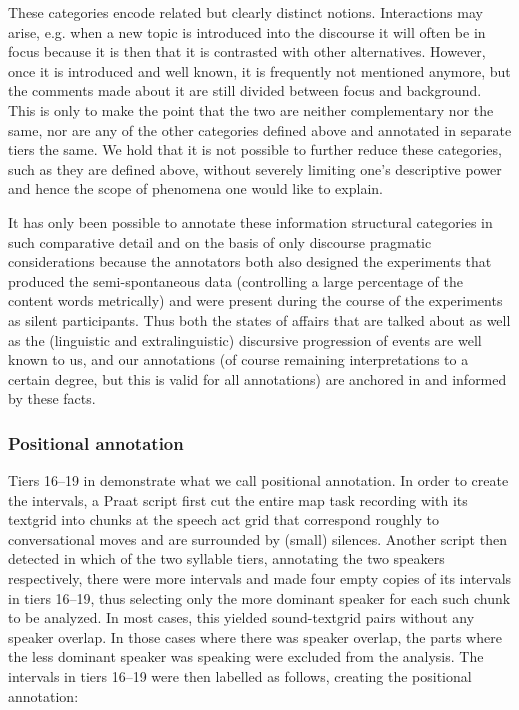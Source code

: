 \documentclass[output=paper]{LSP/langsci}
\begin{document}
These categories encode related but clearly distinct notions. Interactions may arise, e.g. when a new topic is introduced into the discourse it will often be in focus because it is then that it is contrasted with other alternatives. However, once it is introduced and well known, it is frequently not mentioned anymore, but the comments made about it are still divided between focus and background. This is only to make the point that the two are neither complementary nor the same, nor are any of the other categories defined above and annotated in separate tiers the same. We hold that it is not possible to further reduce these categories, such as they are defined above, without severely limiting one’s descriptive power and hence the scope of phenomena one would like to explain. 

It has only been possible to annotate these information structural categories in such comparative detail and on the basis of only discourse pragmatic considerations because the annotators both also designed the experiments that produced the semi-spontaneous data (controlling a large percentage of the content words metrically) and were present during the course of the experiments as silent participants. Thus both the states of affairs that are talked about as well as the (linguistic and extralinguistic) discursive progression of events are well known to us, and our annotations (of course remaining interpretations to a certain degree, but this is valid for all annotations) are anchored in and informed by these facts. 

\subsubsection{Positional annotation}
Tiers 16--19 in  demonstrate what we call positional annotation. In order to create the intervals, a {Praat} script first cut the entire map task recording with its textgrid into chunks at the speech act grid that correspond roughly to conversational moves and are surrounded by (small) silences. Another script then detected in which of the two syllable tiers, annotating the two speakers respectively, there were more intervals and made four empty copies of its intervals in tiers 16--19, thus selecting only the more dominant speaker for each such chunk to be analyzed. In most cases, this yielded sound-textgrid pairs without any speaker overlap. In those cases where there was speaker overlap, the parts where the less dominant speaker was speaking were excluded from the analysis. The intervals in tiers 16--19 were then labelled as follows, creating the positional annotation:
\end{document}
